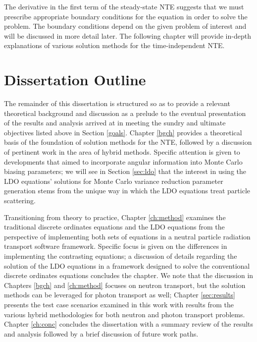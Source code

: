 The derivative in the first term of the steady-state NTE suggests that we must prescribe 
appropriate boundary conditions for the equation in order to solve the problem. The boundary
conditions depend on the given problem of interest and will be discussed in more detail later.
The following chapter will provide in-depth explanations of various solution methods 
for the time-independent NTE.

\section{Dissertation Outline}

The remainder of this dissertation is structured so as to provide a relevant theoretical
background and discussion as a prelude to the eventual presentation of the results and analysis
arrived at in meeting the sundry and ultimate objectives listed above in Section \ref{goals}.
Chapter \ref{bgch} provides a theoretical basis of the foundation of solution methods for the
NTE, followed by a discussion of pertinent work in the area of hybrid methods. Specific attention
is given to developments that aimed to incorporate angular information into Monte Carlo biasing
parameters; we will see in Section \ref{sec:ldo} that the interest in using the LDO equations'
solutions for Monte Carlo variance reduction parameter generation stems from the unique way in
which the LDO equations treat particle scattering.

Transitioning from theory to practice, Chapter \ref{ch:method} examines the
traditional discrete ordinates equations and the LDO equations from the
perspective of implementing both sets of  equations in a neutral particle
radiation transport software framework. Specific focus is given on the
differences in implementing the contrasting equations; a discussion of details
regarding the solution of the LDO equations in a framework designed to solve the
conventional discrete ordinates equations concludes the chapter.  We note that
the discussion in Chapters \ref{bgch} and \ref{ch:method} focuses on neutron
transport, but the solution methods can be leveraged for photon transport as
well; Chapter \ref{sec:results} presents the test case scenarios examined in
this work with results from the various hybrid methodologies for both neutron
and photon transport problems. Chapter  \ref{ch:conc} concludes the dissertation
with a summary review of the results and  analysis followed by a brief
discussion of future work paths.
